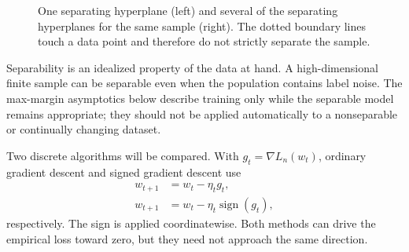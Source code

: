 \documentclass[11pt,twoside]{article}
\newcommand{\sign}{\operatorname{sign}}
\theoremstyle{definition}
\theoremstyle{remark}
\begin{document}
\begin{figure}[H]
\centering
{}
\newcommand{\ltenseparabledata}{%
  \foreach \a/\b in {-1.4/0.9,-0.9/1.4,-0.6/0.5,-1.5/1.5,0.2/1.6,0.5/0.8,0.9/0.5,1.0/1.3,1.5/1.2,0.6/1.8,-0.5/1.0}
    \fill[tabblue] (\a,\b) circle (1.5pt);
  \foreach \a/\b in {-1.3/-1.0,-0.8/-0.7,-0.4/-1.2,0.1/-0.7,0.4/-1.5,0.8/-0.9,1.3/-0.6,-1.5/-1.4,-0.9/-1.7,1.4/-1.2}
    \fill[taborange] (\a,\b) circle (1.5pt);
}
\hfill
{}
\hfill
{}
\hfill\mbox{}
\caption{One separating hyperplane (left) and several of the separating
hyperplanes for the same sample (right). The dotted boundary lines touch a
data point and therefore do not strictly separate the sample.}
\label{fig:separable-data}
\end{figure}

Separability is an idealized property of the data at hand. A high-dimensional
finite sample can be separable even when the population contains label noise.
The max-margin asymptotics below describe training only while the separable
model remains appropriate; they should not be applied automatically to a
nonseparable or continually changing dataset.

Two discrete algorithms will be compared. With
$g_t=\nabla L_n(w_t)$, ordinary gradient descent and signed gradient descent
use
\begin{align}
 w_{t+1}&=w_t-\eta_t g_t,
 \label{eq:logistic-gd}\\
 w_{t+1}&=w_t-\eta_t\sign(g_t),
 \label{eq:logistic-signgd}
\end{align}
respectively. The sign is applied coordinatewise. Both methods can drive the
empirical loss toward zero, but they need not approach the same direction.
\end{document}
